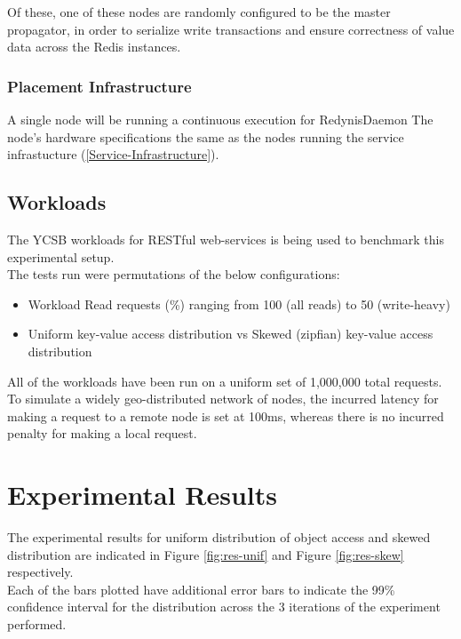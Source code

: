 \documentclass{sig-alternate}
\begin{document}
Of these, one of these nodes are randomly configured to be the master propagator, in order to serialize write transactions and ensure correctness of value data across the Redis instances.

\subsubsection{Placement Infrastructure}
A single node will be running a continuous execution for RedynisDaemon \cite{redynis-daemon}
The node's hardware specifications the same as the nodes running the service infrastucture (\ref{Service-Infrastructure}).

\subsection{Workloads}
The YCSB workloads for RESTful web-services is being used to benchmark this experimental setup.\\

The tests run were permutations of the below configurations:

\begin{itemize}
	\item  Workload Read requests (\%) ranging from 100 (all reads) to 50 (write-heavy)
	\item  Uniform key-value access distribution vs Skewed (zipfian) key-value access distribution
\end{itemize}

All of the workloads have been run on a uniform set of 1,000,000 total requests. To simulate a widely geo-distributed network of nodes, the incurred latency for making a request to a remote node is set at 100ms\cite{latency-stats}, whereas there is no incurred penalty for making a local request.

\section{Experimental Results}

The experimental results for uniform distribution of object access and skewed distribution are indicated in Figure \ref{fig:res-unif} and Figure \ref{fig:res-skew} respectively.\\

Each of the bars plotted have additional error bars to indicate the 99\% confidence interval for the distribution across the 3 iterations of the experiment performed. \\
\end{document}
